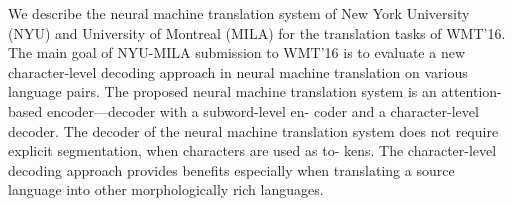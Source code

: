 We describe the neural machine translation system of New York University (NYU) and University of Montreal (MILA) for the translation tasks of WMT'16. The main goal of NYU-MILA submission to WMT'16 is to evaluate a new character-level decoding approach in neural machine translation on various language pairs. The proposed neural machine translation system is an attention-based encoder---decoder with a subword-level en- coder and a character-level decoder. The decoder of the neural machine translation system does not require explicit segmentation, when characters are used as to- kens. The character-level decoding approach provides benefits especially when translating a source language into other morphologically rich languages.
